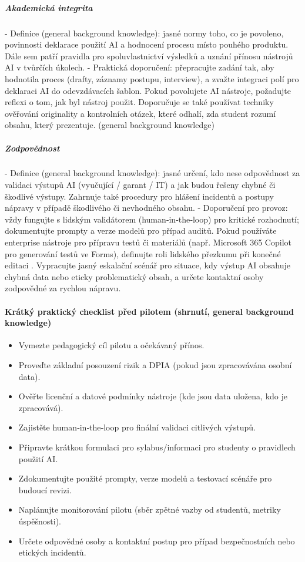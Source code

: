 \subparagraph{Akademická integrita}
- Definice (general background knowledge): jasné normy toho, co je povoleno, povinnosti deklarace použití AI a hodnocení procesu místo pouhého produktu. Dále sem patří pravidla pro spoluvlastnictví výsledků a uznání přínosu nástrojů AI v tvůrčích úkolech.
- Praktická doporučení: přepracujte zadání tak, aby hodnotila proces (drafty, záznamy postupu, interview), a zvažte integraci polí pro deklaraci AI do odevzdávacích šablon. Pokud povolujete AI nástroje, požadujte reflexi o tom, jak byl nástroj použit. Doporučuje se také používat techniky ověřování originality a kontrolních otázek, které odhalí, zda student rozumí obsahu, který prezentuje. (general background knowledge)

\subparagraph{Zodpovědnost}
- Definice (general background knowledge): jasné určení, kdo nese odpovědnost za validaci výstupů AI (vyučující / garant / IT) a jak budou řešeny chybné či škodlivé výstupy. Zahrnuje také procedury pro hlášení incidentů a postupy nápravy v případě škodlivého či nevhodného obsahu.
- Doporučení pro provoz: vždy fungujte s lidským validátorem (human‑in‑the‑loop) pro kritické rozhodnutí; dokumentujte prompty a verze modelů pro případ auditů. Pokud používáte enterprise nástroje pro přípravu testů či materiálů (např. Microsoft 365 Copilot pro generování testů ve Forms), definujte roli lidského přezkumu při konečné editaci \cite{kb_ai_101_tipu_pdf_04e4a115_page_36_1}. Vypracujte jasný eskalační scénář pro situace, kdy výstup AI obsahuje chybná data nebo eticky problematický obsah, a určete kontaktní osoby zodpovědné za rychlou nápravu.

\paragraph{Krátký praktický checklist před pilotem (shrnutí, general background knowledge)}
\begin{itemize}
  \item Vymezte pedagogický cíl pilotu a očekávaný přínos.
  \item Proveďte základní posouzení rizik a DPIA (pokud jsou zpracovávána osobní data).
  \item Ověřte licenční a datové podmínky nástroje (kde jsou data uložena, kdo je zpracovává).
  \item Zajistěte human‑in‑the‑loop pro finální validaci citlivých výstupů.
  \item Připravte krátkou formulaci pro sylabus/informaci pro studenty o pravidlech použití AI.
  \item Zdokumentujte použité prompty, verze modelů a testovací scénáře pro budoucí revizi.
  \item Naplánujte monitorování pilotu (sběr zpětné vazby od studentů, metriky úspěšnosti).
  \item Určete odpovědné osoby a kontaktní postup pro případ bezpečnostních nebo etických incidentů.
\end{itemize}

